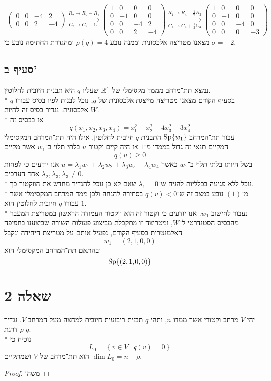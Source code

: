 \begin{align*}
\begin{pmatrix}
		0 & 0 & -4 & 2 \\
		0 & 0 & 2 & -4
	\end{pmatrix}
	\xrightarrow[C_2 \to C_2 - C_1]{R_2 \to R_2 - R_1}
	\begin{pmatrix}
		1 & 0 & 0 & 0 \\
		0 & -1 & 0 & 0 \\
		0 & 0 & -4 & 2 \\
		0 & 0 & 2 & -4
	\end{pmatrix}
	\xrightarrow[C_4 \to C_4 + \frac{1}{2}C_3]{R_4 \to R_4 + \frac{1}{2}R_2}
	\begin{pmatrix}
		1 & 0 & 0 & 0 \\
		0 & -1 & 0 & 0 \\
		0 & 0 & -4 & 0 \\
		0 & 0 & 0 & -3
	\end{pmatrix}
\end{align*}
מצאנו מטריצה אלכסונית וממנה נובע $\rho(q) = 4$ ומהגדרת החתימה נובע כי $\sigma = -2$.

\subsection{סעיף ב'}
נמצא תת־מרחב מממד מקסימלי של $\mathbb{R}^4$ שעליו $q$ היא תבנית חיובית לחלוטין. \\*
בסעיף הקודם מצאנו מטריצה מייצגת אלכסונית של $q$, נוכל לבנות לפיו בסיס עבורו $q$ אלכסונית. נגדיר בסיס זה להיות $W$. \\*
אז בבסיס זה
\[
	q(x_1, x_2, x_3, x_4) = x_1^2 - x_2^2 - 4x_3^2 - 3x_4^2 \tag{1}
\]
עבור תת־המרחב $\operatorname{Sp}\{ w_1 \}$ התבנית $q$ חיובית לחלוטין.
אילו היה תת־המרחב המקסימלי המקיים תנאי זה גדול בממדו מ־$1$ אז היה קיים וקטור $u$ בלתי תלוי ב־$w_1$ אשר מקיים
\[
	q(u) \ge 0
\]
בשל היותו בלתי תלוי ב־$w_1$ כאשר $u = \lambda_1 w_1 + \lambda_2 w_2 + \lambda_3 w_3 + \lambda_4 w_4$
אנו יודעים כי לפחות אחד הערכים $\lambda_2, \lambda_3, \lambda_3 \ne 0$. \\*
נוכל ללא פגיעה בכלליות להניח ש־$\lambda_1 = 0$ שאם לא כן נוכל להגדיר מחדש את הווקטור כך. \\*
מ־$(1)$ נובע במצב זה ש־$q(v) < 0$ בסתירה להנחה ולכן ממד המרחב המקסימלי אשר עבורו $q$ חיובית לחלוטין הוא $1$. \\*
נעבור לחישוב $w_1$. אנו יודעים כי וקטור זה הוא ווקטור העמודה הראשון במטריצת המעבר מהבסיס הסטנדרטי ל־$W$,
ומטריצה זו מתקבלת מביצוע פעולות השורה שביצענו בחפיפה האלמנטרית בסעיף הקודם, נפעיל אותם על מטריצת היחידה ונקבל
\[
	w_1 = (2, 1, 0, 0)
\]
ובהתאם תת־המרחב המקסימלי הוא
\[
	\operatorname{Sp}\{ (2, 1, 0, 0) \}
\]

\section{שאלה 2}
יהי $V$ מרחב וקטורי אשר ממדו $n$, ותהי $q$ תבנית ריבועית חיובית למחצה מעל המרחב $V$. נגדיר $\rho$ דרגת $q$.\\*
נוכיח כי
\[
	L_0 = \left\{ v \in V \mid q(v) = 0 \right\}
\]
הוא תת־מרחב של $V$ ושמתקיים $\dim L_0 = n - \rho$.
\begin{proof}
	משהו
\end{proof}


